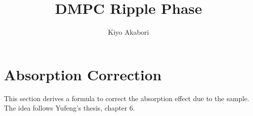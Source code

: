 \documentclass[letterpaper,12pt]{article}
\author{Kiyo Akabori}
\title{DMPC Ripple Phase}
\newcommand{\+}{^{\dagger}}%
\begin{document}




\section{Absorption Correction}
This section derives a formula to correct the absorption effect due to the sample.
The idea follows Yufeng's thesis, chapter 6. 
\end{document}
